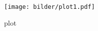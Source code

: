 \begin{figure}
    \centering
    \texttt{[image: bilder/plot1.pdf]}    
    \caption{plot}
    \label{plt:1}
\end{figure}
